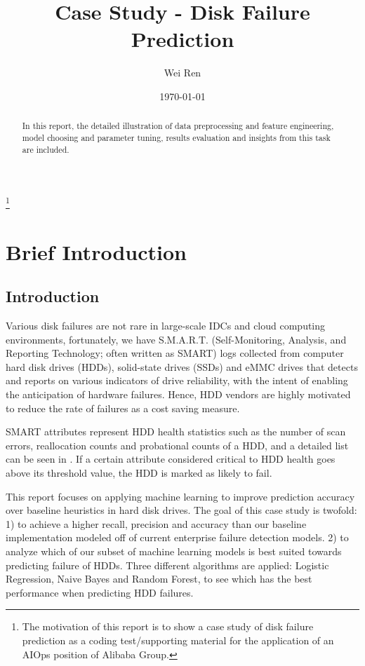 \documentclass[12pt,a4paper,english]{amsart}
\begin{document}
\title{Case Study - Disk Failure Prediction}%
\author{Wei Ren}%
%

\date{\today}
\thanks{The motivation of this report is to show a case study of disk failure prediction as a coding test/supporting material for the application of an AIOps position of Alibaba Group.}
\begin{abstract}
 In this report, the detailed illustration of data preprocessing and feature engineering, model choosing and parameter tuning, results evaluation and insights from this task are included.
\end{abstract}
\maketitle
\section{Brief Introduction}

\subsection{Introduction}

Various disk failures are not rare in large-scale IDCs and cloud computing environments, fortunately, we have S.M.A.R.T. (Self-Monitoring, Analysis, and Reporting Technology; often written as SMART) logs collected from computer hard disk drives (HDDs), solid-state drives (SSDs) and eMMC drives that detects and reports on various indicators of drive reliability, with the intent of enabling the anticipation of hardware failures. Hence, HDD vendors are highly motivated to reduce the rate of failures as a cost saving measure.

SMART attributes represent HDD health statistics such as the number of scan errors, reallocation counts and probational counts of a HDD, and a detailed list can be seen in \cite{Wiki-smart}. If a certain attribute considered critical to HDD health goes above its threshold value, the HDD is marked as likely to fail\cite{Pinheiro2007}.


This report focuses on applying machine learning to improve prediction accuracy over baseline heuristics in hard disk drives. The goal of this case study is twofold: 1) to achieve a higher recall, precision and accuracy than our baseline implementation modeled off of current enterprise failure detection models. 2) to analyze which of our subset of machine learning models is best suited towards predicting failure of HDDs. Three different algorithms are applied: Logistic Regression, Naive Bayes and Random Forest, to see which has the best performance when predicting HDD failures.
\end{document}
